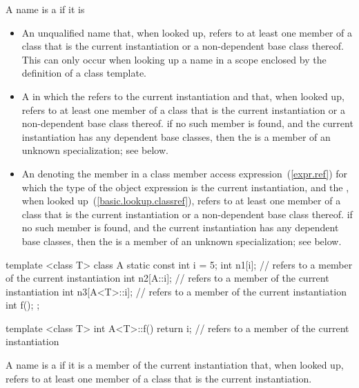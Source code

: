 \pnum
{}%
A name is a
if it is

\begin{itemize}
\item
An unqualified name that, when looked up, refers to
at least one member of a class that is
the current instantiation or a non-dependent base class thereof.
\enternote
This can only occur when looking up a name in a scope enclosed by the
definition of a class template.
\exitnote
\item
A
in which the
refers to the current instantiation
and that, when looked up, refers to at least one member of a class that is
the current
instantiation or a non-dependent base class thereof. \enternote if no such
member is found, and the current instantiation has any dependent base classes,
then the  is a member of an unknown specialization;
see below. \exitnote

\item
An  denoting the member in a class member access
expression~(\ref{expr.ref}) for which the type of the object expression is the
current instantiation, and the , when looked
up~(\ref{basic.lookup.classref}), refers to at least one member of a class
that is the current
instantiation or a non-dependent base class thereof. \enternote if no such
member is found, and the current instantiation has any dependent base classes,
then the  is a member of an unknown specialization;
see below. \exitnote
\end{itemize}

\enterexample
\begin{codeblock}
template <class T> class A {
  static const int i = 5;
  int n1[i];        //  refers to a member of the current instantiation
  int n2[A::i];     //  refers to a member of the current instantiation
  int n3[A<T>::i];  //  refers to a member of the current instantiation
  int f();
};

template <class T> int A<T>::f() {
  return i;         //  refers to a member of the current instantiation
}
\end{codeblock}
\exitexample

%
A name is a  if it is a
member of the current instantiation that, when looked up, refers to at least
one member of a class that is the current instantiation.

